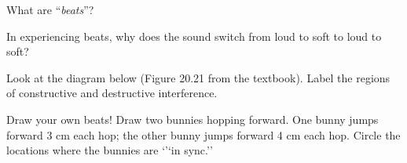 \documentclass[10pt]{exam}
\begin{document}
\begin{questions}
  \question
    What are ``\emph{beats}''?

  \question
    In experiencing beats, why does the sound switch from loud to soft to loud to soft?

  \question
    Look at the diagram below (Figure 20.21 from the textbook).  Label the regions of constructive and destructive interference.

 
  \question
    Draw your own beats!  Draw two bunnies hopping forward.  One bunny jumps forward 3 cm each hop; the other bunny jumps forward 4 cm each hop.  Circle the locations where the bunnies are `'`in sync.''

\end{questions}

\section{}

\section{}
\end{document}
